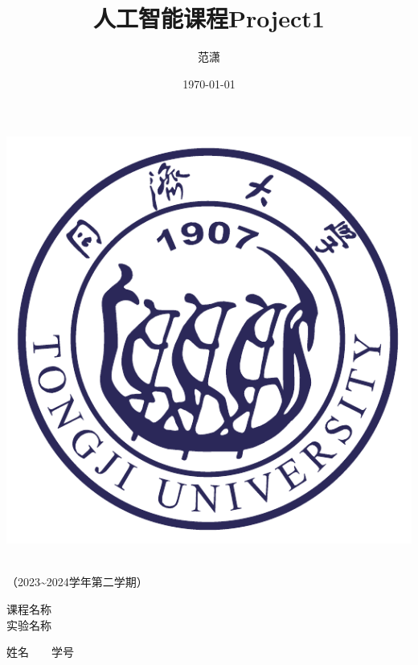 \documentclass[a4paper]{report}
\author{\Large{范潇\quad2254298}}
\title{\sffamily\Huge\bfseries{人工智能课程Project1}}
\date{\Large{\today}}
\begin{document}
\begin{titlepage}
    \heiti
    \vspace*{64pt}
    \begin{center}
        \includegraphics{./pic/tongji-logo-purple.pdf}

        \vspace*{36pt}
        \\
        \vspace*{48pt}
        \LARGE（2023\~{}2024学年第二学期）\\
        \vspace*{48pt}
    
        \LARGE 课程名称\ \ \underline{}\\
        \LARGE 实验名称\ \ \underline{}\\
        \vspace*{36pt}
    
        \Large 姓名\ \ \underline{}\ \ 学号\ \ \underline{}\\
    \end{center}
\end{titlepage}







\end{document}
